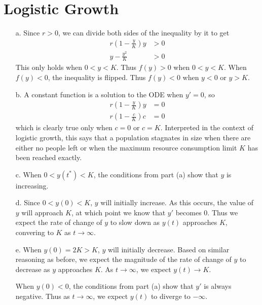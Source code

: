 \documentclass{article}
\begin{document}
\section{Logistic Growth}
\begin{enumerate}
	\item[a.] Since $r>0$, we can divide both sides of the inequality by it to get
		\begin{align*}
			r\left(1-\frac{y}{K}\right) y &> 0 \\
			y - \frac{y^2}{K} &> 0
		\end{align*}
		This only holds when $0<y<K$. Thus $f(y) > 0$ when $0<y<K$.
		When $f(y) < 0$, the inequality is flipped. Thus $f(y) < 0$ when $y<0$ or $y>K$.
	\item[b.] A constant function is a solution to the ODE when $y' =0$, so
		\begin{align*}
			r \left( 1 - \frac{y}{K} \right) y &= 0 \\
			r \left( 1 - \frac{c}{K} \right) c &= 0
		\end{align*}
		which is clearly true only when $c=0$ or $c=K$. Interpreted in the context of logistic growth, this says that a population stagnates in size when there are either no people left or when the maximum resource consumption limit $K$ has been reached exactly.
	\item[c.] When $0 < y(t^*) < K$, the conditions from part (a) show that $y$ is increasing.
	\item[d.] Since $0 < y(0) < K$, $y$ will initially increase. As this occurs, the value of $y$ will approach $K$, at which point we know that $y'$ becomes 0. Thus we expect the rate of change of $y$ to slow down as $y(t)$ approaches $K$, convering to $K$ as $t \to \infty$.
	\item[e.]
		When $y(0) = 2K > K$, $y$ will initially decrease. Based on similar reasoning as before, we expect the magnitude of the rate of change of $y$ to decrease as $y$ approaches $K$. As $t \to \infty$, we expect $y(t) \to K$.

		When $y(0) < 0$, the conditions from part (a) show that $y'$ is always negative. Thus as $t \to \infty$, we expect $y(t)$ to diverge to $-\infty$.
\end{enumerate}
\end{document}
